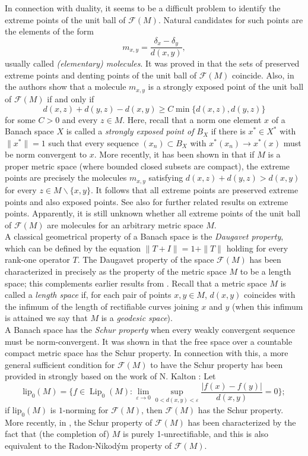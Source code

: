 \documentclass[12pt,leqno]{amsart}
\numberwithin{equation}{section} %
\theoremstyle{definition}
\numberwithin{equation}{section}
\def\Lip{\operatorname{Lip}}
\begin{document}
In connection with duality, it seems to be a difficult problem to identify the extreme points of the unit ball of $\mathcal F(M)$. Natural candidates for such points are the elements of the form $$m_{x,y}=\frac{\delta_x-\delta_y}{d(x,y)},$$ usually called \textit{(elementary) molecules}. It was proved in \cite{GPPR18} that the sets of preserved extreme points and denting points of the unit ball of $\mathcal F(M)$ coincide. Also, in \cite{GPR18} the authors show that a molecule $m_{x,y}$ is a strongly exposed point of the unit ball of $\mathcal F(M)$ if and only if
$$
d(x,z)+d(y,z)-d(x,y)\geq C\min\{d(x,z),d(y,z)\}
$$
for some $C>0$ and every $z\in M$. Here, recall that a norm one element $x$ of a Banach space $X$ is called a \textit{strongly exposed point of $B_X$} if there is $x^*\in X^*$ with $\|x^*\|=1$ such that every sequence $(x_n)\subset B_X$ with $x^*(x_n)\rightarrow x^*(x)$ must be norm convergent to $x$. More recently, it has been shown in \cite{Aliaga} that if $M$ is a proper metric space (where bounded closed subsets are compact), the extreme points are precisely the molecules $m_{x,y}$ satisfying $d(x,z)+d(y,z)>d(x,y)$ for every $z\in M\backslash\{x,y\}$. It follows that all extreme points are preserved extreme points and also exposed points. See also \cite{AG, APPP} for further related results on extreme points. Apparently, it is still unknown whether all extreme points of the unit ball of $\mathcal F(M)$ are molecules for an arbitrary metric space $M$.\\

A classical geometrical property of a Banach space is the \textit{Daugavet property}, which can be defined by the equation $\|T+I\|=1+\|T\|$ holding for every rank-one operator $T$. The Daugavet property of the space $\mathcal F(M)$ has been characterized in \cite{GPR18} precisely as the property of the metric space $M$ to be a length space; this complements earlier results from \cite{IKW}. Recall that a metric space $M$ is called a \textit{length space} if, for each pair of points $x,y\in M$, $d(x,y)$ coincides with the infimum of the length of rectifiable curves joining $x$ and $y$ (when this infimum is attained we say that $M$ is a \textit{geodesic space}).\\

A Banach space has the \textit{Schur property} when every weakly convergent sequence must be norm-convergent. It was shown in \cite{HLP} that the free space over a countable compact metric space has the Schur property. In connection with this, a more general sufficient condition for $\mathcal F(M)$ to have the Schur property has been provided in \cite{Pet} strongly based on the work of N. Kalton \cite{K:04}: Let $$\text{lip}_0(M)=\Big\{f\in\Lip_0(M):\lim_{\varepsilon\rightarrow0}\sup_{0<d(x,y)<\varepsilon}\frac{|f(x)-f(y)|}{d(x,y)}=0\Big\};$$ if $\text{lip}_0(M)$ is $1$-norming for $\mathcal F(M)$, then $\mathcal F(M)$ has the Schur property. More recently, in \cite{AGPP}, the Schur property of $\mathcal F(M)$ has been characterized by the fact that (the completion of) $M$ is purely 1-unrectifiable, and this is also equivalent to the Radon-Nikod\'ym property of $\mathcal F(M)$. \\
\end{document}
